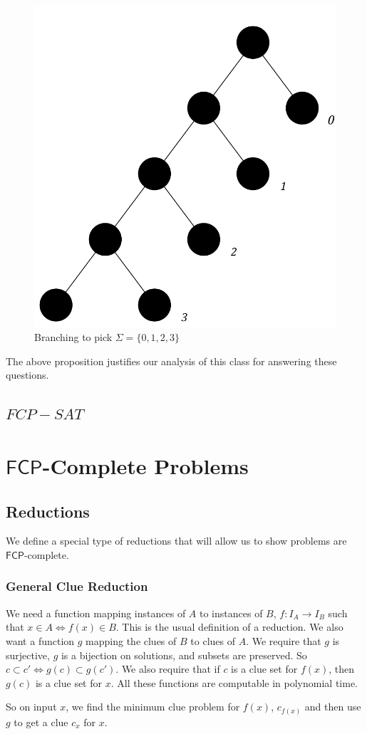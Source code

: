 \documentclass[runningheads,a4paper]{llncs}
\begin{document}
\begin{figure}
\centering
\label{fig:branching}
\includegraphics[width=0.4\linewidth]{branching.pdf}
\caption{Branching to pick $\Sigma = \{ 0, 1, 2, 3 \}$}
\end{figure}

The above proposition justifies our analysis of this class for answering these questions.

\subsection{$FCP-SAT$}

\section{$\mathsf{FCP}$-Complete Problems}

\subsection{Reductions}

We define a special type of reductions that will allow us to show problems are $\mathsf{FCP}$-complete. 

\subsubsection{General Clue Reduction}
We need a function mapping instances of $A$ to instances of $B$, $f: I_A \rightarrow I_B$ such that $x \in A \iff f(x) \in B$. This is the usual definition of a reduction. We also want a function $g$ mapping the clues of $B$ to clues of $A$. We require that $g$ is surjective, $g$ is a bijection on solutions, and subsets are preserved. So $c \subset c' \iff g(c) \subset g(c')$. We also require that if $c$ is a clue set for $f(x)$, then $g(c)$ is a clue set for $x$. All these functions are computable in polynomial time.

So on input $x$, we find the minimum clue problem for $f(x)$, $c_{f(x)}$ and then use $g$ to get a clue $c_x$ for $x$.  
\end{document}
